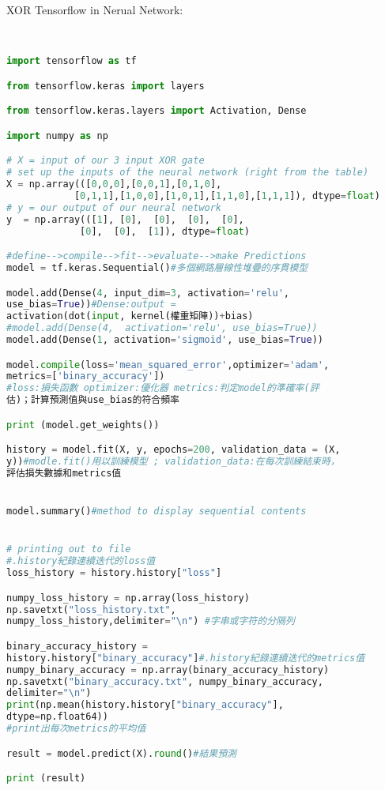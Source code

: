\documentclass[12pt,a4paper]{article}
\begin{document}
\begin{Large}XOR Tensorflow in Nerual Network:\end{Large}\\[6pt]
\begin{lstlisting}[language=python]
import tensorflow as tf

from tensorflow.keras import layers

from tensorflow.keras.layers import Activation, Dense

import numpy as np

# X = input of our 3 input XOR gate
# set up the inputs of the neural network (right from the table)
X = np.array(([0,0,0],[0,0,1],[0,1,0], 
            [0,1,1],[1,0,0],[1,0,1],[1,1,0],[1,1,1]), dtype=float)
# y = our output of our neural network
y  = np.array(([1], [0],  [0],  [0],  [0], 
             [0],  [0],  [1]), dtype=float)

#define-->compile-->fit-->evaluate-->make Predictions
model = tf.keras.Sequential()#多個網路層線性堆疊的序貫模型

model.add(Dense(4, input_dim=3, activation='relu',
use_bias=True))#Dense:output = 
activation(dot(input, kernel(權重矩陣))+bias)
#model.add(Dense(4,  activation='relu', use_bias=True))
model.add(Dense(1, activation='sigmoid', use_bias=True))

model.compile(loss='mean_squared_error',optimizer='adam',
metrics=['binary_accuracy'])
#loss:損失函數 optimizer:優化器 metrics:判定model的準確率(評
估)；計算預測值與use_bias的符合頻率

print (model.get_weights())

history = model.fit(X, y, epochs=200, validation_data = (X, 
y))#modle.fit()用以訓練模型 ; validation_data:在每次訓練結束時，
評估損失數據和metrics值


model.summary()#method to display sequential contents


# printing out to file
#.history紀錄連續迭代的loss值
loss_history = history.history["loss"]

numpy_loss_history = np.array(loss_history)
np.savetxt("loss_history.txt", 
numpy_loss_history,delimiter="\n") #字串或字符的分隔列

binary_accuracy_history = 
history.history["binary_accuracy"]#.history紀錄連續迭代的metrics值
numpy_binary_accuracy = np.array(binary_accuracy_history)
np.savetxt("binary_accuracy.txt", numpy_binary_accuracy, 
delimiter="\n")
print(np.mean(history.history["binary_accuracy"],
dtype=np.float64))
#print出每次metrics的平均值

result = model.predict(X).round()#結果預測

print (result)
\end{lstlisting}
\end{document}

